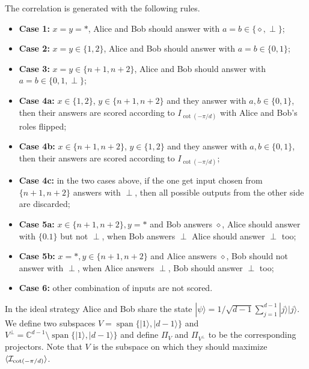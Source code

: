 \documentclass[11pt,letterpaper]{article}
\newcommand{\ket}[1]{|#1\rangle}
\DeclarePairedDelimiter{\ip}{\langle}{\rangle}
\DeclareMathOperator{\spn}{span}
\newcommand{\C}{\mathbb{C}}
\newcommand{\1}{\mathbb{1}}
\newcommand{\I}{\mathcal{I}}
\theoremstyle{definition}
\begin{document}
The correlation is generated with the following rules.
\begin{itemize}
	\item \textbf{Case 1:} $x = y = \ast$, Alice and Bob should answer with $a = b \in \{\diamond, \perp\}$;
	\item \textbf{Case 2:} $x = y \in \{1,2\}$, Alice and Bob should answer with $a = b \in \{0, 1\}$;
	\item \textbf{Case 3:} $x = y \in \{n+1, n+2\}$, Alice and Bob should answer with $a = b \in \{0, 1, \perp\}$;
	\item \textbf{Case 4a:} $x \in \{1,2\}$, $y \in \{n+1, n+2\}$ and they answer with $a,b \in \{0,1\}$, then
	their answers are scored according to $I_{\cot(-\pi/d)}$ with Alice and Bob's roles flipped;
	\item \textbf{Case 4b:} $x \in \{n+1, n+2\}$, $y \in \{1,2\}$ and they answer with $a,b \in \{0,1\}$, then
	their answers are scored according to $I_{\cot(-\pi/d)}$;
	\item \textbf{Case 4c:} in the two cases above, if the one get input chosen from $\{n+1,n+2\}$ answers
	 with $\perp$, then all possible outputs from the other side are discarded;
	\item \textbf{Case 5a:} $x \in \{n+1,n+2\}, y = \ast$ and Bob answers $\diamond$, Alice should answer with $\{0.1\}$ but not $\perp$, when Bob answers $\perp$ Alice should answer $\perp$ too;
	\item \textbf{Case 5b:} $x = \ast, y \in \{n+1, n+2\}$ and Alice answers $\diamond$, Bob should not answer with $\perp$,
	when Alice answers $\perp$, Bob should answer $\perp$ too;
	\item \textbf{Case 6:} other combination of inputs are not scored.
\end{itemize}
In the ideal strategy Alice and Bob share the state $\ket{\psi} =1/\sqrt{d-1} \sum_{j=1}^{d-1} \ket{j}\ket{j}$.
We define two subspaces $V = \spn\{\ket{1}, \ket{d-1}\}$ and $V^\perp = \C^{d-1} \setminus\spn\{\ket{1}, \ket{d-1}\}$ and
define $\Pi_V$ and $\Pi_{V^\perp}$ to be the corresponding projectors. Note that $V$ is the subspace on which they should maximize $\ip{\I_{\cot(-\pi/d)}}$.
\end{document}
